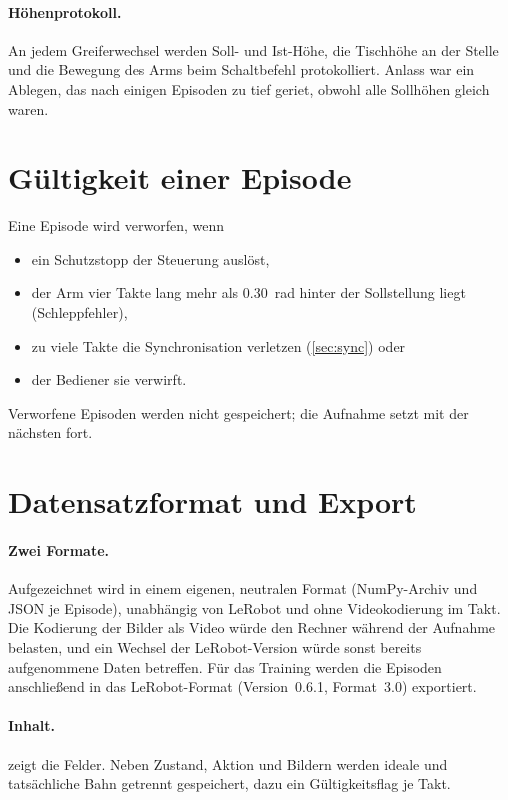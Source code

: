 \paragraph{Höhenprotokoll.} An jedem Greiferwechsel werden Soll- und Ist-Höhe, die Tischhöhe
an der Stelle und die Bewegung des Arms beim Schaltbefehl protokolliert. Anlass war ein
Ablegen, das nach einigen Episoden zu tief geriet, obwohl alle Sollhöhen gleich waren.

\section{Gültigkeit einer Episode}
\label{sec:gueltigkeit}

Eine Episode wird verworfen, wenn
\begin{itemize}
  \item ein Schutzstopp der Steuerung auslöst,
  \item der Arm vier Takte lang mehr als \SI{0.30}{rad} hinter der Sollstellung liegt
    (Schleppfehler),
  \item zu viele Takte die Synchronisation verletzen (\cref{sec:sync}) oder
  \item der Bediener sie verwirft.
\end{itemize}
Verworfene Episoden werden nicht gespeichert; die Aufnahme setzt mit der nächsten fort.

\section{Datensatzformat und Export}
\label{sec:datensatz}

\paragraph{Zwei Formate.} Aufgezeichnet wird in einem eigenen, neutralen Format (NumPy-Archiv
und JSON je Episode), unabhängig von LeRobot und ohne Videokodierung im Takt. Die
Kodierung der Bilder als Video würde den Rechner während der Aufnahme belasten, und ein
Wechsel der LeRobot-Version würde sonst bereits aufgenommene Daten betreffen. Für das
Training werden die Episoden anschließend in das LeRobot-Format (Version~0.6.1, Format~3.0)
exportiert.

\paragraph{Inhalt.}  zeigt die Felder. Neben Zustand, Aktion und Bildern
werden ideale und tatsächliche Bahn getrennt gespeichert, dazu ein Gültigkeitsflag je Takt.

